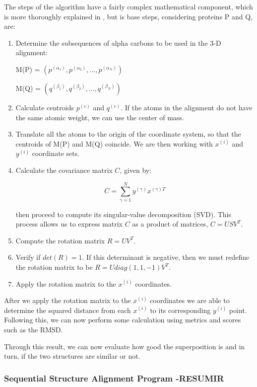 The steps of the algorithm have a fairly complex mathematical component, which is more thoroughly explained in \cite{burkowski2008structural}, but is base steps, considering proteins P and Q, are:
\begin{enumerate}
	\item Determine the subsequences of alpha carbons to be used in the 3-D alignment:
	\begin{center}
		M(P) = $(p^{(\alpha_{1})},p^{(\alpha_{2})},...,p^{(\alpha_{N})})$
		
		M(Q) = $(q^{(\beta_{1})},q^{(\beta_{2})},...,q^{(\beta_{N})})$
	\end{center}
	\item Calculate centroids $p^{(c)}$ and $q^{(c)}$. If the atoms in the alignment do not have the same atomic weight, we can use the center of mass.
	\item Translate all the atoms to the origin of the coordinate system, so that the centroids of M(P) and M(Q) coincide. We are then working with $x^{(i)}$ and $y^{(i)}$ coordinate sets.
	\item Calculate the covariance matrix $C$, given by:
	
	$$C = \sum_{\gamma=1}^{N} y^{(\gamma)}x^{(\gamma)T}$$ 
	
	then proceed to compute its singular-value decomposition (SVD). This process allows us to express matrix $C$ as a product of matrices, $C = USV^{T}$.
	\item Compute the rotation matrix $R = UV^{T}$.
	\item Verify if $det(R) = 1$. If this determinant is negative, then we must redefine the rotation matrix to be $R = Udiag(1,1,-1)V^{T}$.
	\item Apply the rotation matrix to the $x^{(i)}$ coordinates.
\end{enumerate}

After we apply the rotation matrix to the $x^{(i)}$ coordinates we are able to determine the squared distance from each $x^{(i)}$ to its corresponding $y^{(i)}$ point. Following this, we can now perform some calculation using metrics and scores such as the RMSD.

Through this result, we can now evaluate how good the superposition is and in turn, if the two structures are similar or not.

\subsubsection{Sequential Structure Alignment Program -RESUMIR}

